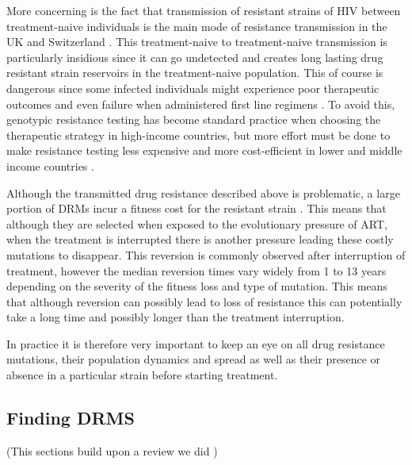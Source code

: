 \documentclass[
  11pt,
  twoside]{scrbook}
\begin{document}
More concerning is the fact that transmission of resistant strains of HIV between treatment-naive individuals is the main mode of resistance transmission in the UK \autocite{mouradPhylotypebasedAnalysisHighlights2015,hueDemonstrationSustainedDrugResistant2009} and Switzerland \autocite{drescherTreatmentNaiveIndividualsAre2014}. This treatment-naive to treatment-naive transmission is particularly insidious since it can go undetected and creates long lasting drug resistant strain reservoirs in the treatment-naive population. This of course is dangerous since some infected individuals might experience poor therapeutic outcomes and even failure when administered first line regimens \autocite{boermaHighLevelsPretreatment2016}. To avoid this, genotypic resistance testing has become standard practice when choosing the therapeutic strategy in high-income countries, but more effort must be done to make resistance testing less expensive and more cost-efficient in lower and middle income countries \autocite{clutterHIV1DrugResistance2016}.

Although the transmitted drug resistance described above is problematic, a large portion of DRMs incur a fitness cost for the resistant strain \autocite{kuhnertQuantifyingFitnessCost2018,mespledeViralFitnessCost2013}. This means that although they are selected when exposed to the evolutionary pressure of ART, when the treatment is interrupted there is another pressure leading these costly mutations to disappear. This reversion is commonly observed after interruption of treatment, however the median reversion times vary widely from 1 to 13 years \autocite{castroPersistenceHIV1Transmitted2013} depending on the severity of the fitness loss and type of mutation. This means that although reversion can possibly lead to loss of resistance this can potentially take a long time and possibly longer than the treatment interruption.

In practice it is therefore very important to keep an eye on all drug resistance mutations, their population dynamics and spread as well as their presence or absence in a particular strain before starting treatment.

\hypertarget{finding-drms}{%
\subsection{Finding DRMS}\label{finding-drms}}

(This sections build upon a review we did \autocite{blasselDrugResistanceMutations2021})
\end{document}
